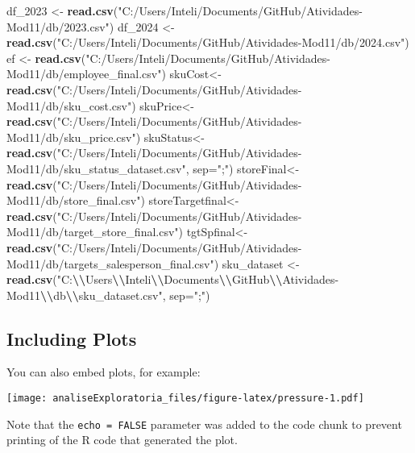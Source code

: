 \documentclass[
]{article}
\newenvironment{Shaded}{\begin{snugshade}}{\end{snugshade}}
\newcommand{\AttributeTok}[1]{\textcolor[rgb]{0.13,0.29,0.53}{#1}}
\newcommand{\FunctionTok}[1]{\textcolor[rgb]{0.13,0.29,0.53}{\textbf{#1}}}
\newcommand{\NormalTok}[1]{#1}
\newcommand{\OtherTok}[1]{\textcolor[rgb]{0.56,0.35,0.01}{#1}}
\newcommand{\SpecialCharTok}[1]{\textcolor[rgb]{0.81,0.36,0.00}{\textbf{#1}}}
\newcommand{\StringTok}[1]{\textcolor[rgb]{0.31,0.60,0.02}{#1}}
\begin{document}
\begin{Shaded}
\begin{Highlighting}[]
\NormalTok{df\_2023 }\OtherTok{\textless{}{-}} \FunctionTok{read.csv}\NormalTok{(}\StringTok{"C:/Users/Inteli/Documents/GitHub/Atividades{-}Mod11/db/2023.csv"}\NormalTok{)}
\NormalTok{df\_2024 }\OtherTok{\textless{}{-}} \FunctionTok{read.csv}\NormalTok{(}\StringTok{"C:/Users/Inteli/Documents/GitHub/Atividades{-}Mod11/db/2024.csv"}\NormalTok{)}
\NormalTok{ef }\OtherTok{\textless{}{-}} \FunctionTok{read.csv}\NormalTok{(}\StringTok{"C:/Users/Inteli/Documents/GitHub/Atividades{-}Mod11/db/employee\_final.csv"}\NormalTok{)}
\NormalTok{skuCost}\OtherTok{\textless{}{-}} \FunctionTok{read.csv}\NormalTok{(}\StringTok{"C:/Users/Inteli/Documents/GitHub/Atividades{-}Mod11/db/sku\_cost.csv"}\NormalTok{)}
\NormalTok{skuPrice}\OtherTok{\textless{}{-}} \FunctionTok{read.csv}\NormalTok{(}\StringTok{"C:/Users/Inteli/Documents/GitHub/Atividades{-}Mod11/db/sku\_price.csv"}\NormalTok{)}
\NormalTok{skuStatus}\OtherTok{\textless{}{-}} \FunctionTok{read.csv}\NormalTok{(}\StringTok{"C:/Users/Inteli/Documents/GitHub/Atividades{-}Mod11/db/sku\_status\_dataset.csv"}\NormalTok{, }\AttributeTok{sep=}\StringTok{";"}\NormalTok{)}
\NormalTok{storeFinal}\OtherTok{\textless{}{-}} \FunctionTok{read.csv}\NormalTok{(}\StringTok{"C:/Users/Inteli/Documents/GitHub/Atividades{-}Mod11/db/store\_final.csv"}\NormalTok{)}
\NormalTok{storeTargetfinal}\OtherTok{\textless{}{-}} \FunctionTok{read.csv}\NormalTok{(}\StringTok{"C:/Users/Inteli/Documents/GitHub/Atividades{-}Mod11/db/target\_store\_final.csv"}\NormalTok{)}
\NormalTok{tgtSpfinal}\OtherTok{\textless{}{-}} \FunctionTok{read.csv}\NormalTok{(}\StringTok{"C:/Users/Inteli/Documents/GitHub/Atividades{-}Mod11/db/targets\_salesperson\_final.csv"}\NormalTok{)}
\NormalTok{sku\_dataset }\OtherTok{\textless{}{-}} \FunctionTok{read.csv}\NormalTok{(}\StringTok{"C:}\SpecialCharTok{\textbackslash{}\textbackslash{}}\StringTok{Users}\SpecialCharTok{\textbackslash{}\textbackslash{}}\StringTok{Inteli}\SpecialCharTok{\textbackslash{}\textbackslash{}}\StringTok{Documents}\SpecialCharTok{\textbackslash{}\textbackslash{}}\StringTok{GitHub}\SpecialCharTok{\textbackslash{}\textbackslash{}}\StringTok{Atividades{-}Mod11}\SpecialCharTok{\textbackslash{}\textbackslash{}}\StringTok{db}\SpecialCharTok{\textbackslash{}\textbackslash{}}\StringTok{sku\_dataset.csv"}\NormalTok{, }\AttributeTok{sep=}\StringTok{";"}\NormalTok{)}
\end{Highlighting}
\end{Shaded}

\subsection{Including Plots}\label{including-plots}

You can also embed plots, for example:

\texttt{[image: analiseExploratoria\_files/figure-latex/pressure-1.pdf]}

Note that the \texttt{echo\ =\ FALSE} parameter was added to the code
chunk to prevent printing of the R code that generated the plot.
\end{document}
